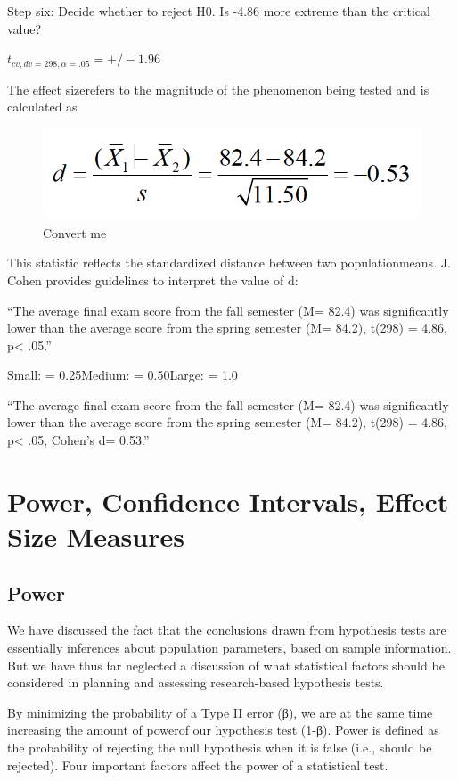 \documentclass[]{book}
\theoremstyle{definition}
\theoremstyle{definition}
\theoremstyle{definition}
\theoremstyle{remark}
\begin{document}
Step six: Decide whether to reject H0. Is -4.86 more extreme than the
critical value?

\(t_{cv,dv=298, \alpha=.05}= +/- 1.96\)

The effect sizerefers to the magnitude of the phenomenon being tested
and is calculated as

\begin{figure}
\centering
\includegraphics{img/hickssampling18.png}
\caption{Convert me}
\end{figure}

This statistic reflects the standardized distance between two
populationmeans. J. Cohen provides guidelines to interpret the value of
d:

``The average final exam score from the fall semester (M= 82.4) was
significantly lower than the average score from the spring semester (M=
84.2), t(298) = 4.86, p\textless{} .05.''

Small: = 0.25Medium: = 0.50Large: = 1.0

``The average final exam score from the fall semester (M= 82.4) was
significantly lower than the average score from the spring semester (M=
84.2), t(298) = 4.86, p\textless{} .05, Cohen's d= 0.53.''

\chapter{Power, Confidence Intervals, Effect Size
Measures}\label{power-confidence-intervals-effect-size-measures}

\section{Power}\label{power}

We have discussed the fact that the conclusions drawn from hypothesis
tests are essentially inferences about population parameters, based on
sample information. But we have thus far neglected a discussion of what
statistical factors should be considered in planning and assessing
research-based hypothesis tests.

By minimizing the probability of a Type II error (β), we are at the same
time increasing the amount of powerof our hypothesis test (1-β). Power
is defined as the probability of rejecting the null hypothesis when it
is false (i.e., should be rejected). Four important factors affect the
power of a statistical test.
\end{document}
